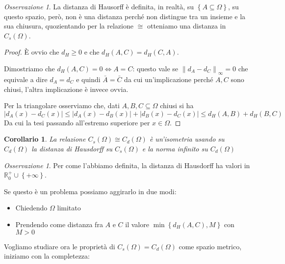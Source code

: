 \documentclass[a4paper,10pt]{article}
\newcounter{counter1}
\theoremstyle{plain}
\newtheorem{mycor}[counter1]{Corollario}
\theoremstyle{definition}
\theoremstyle{remark}
\newtheorem{myoss}[counter1]{Osservazione}
\newcommand{\set}[1]{\left\{#1\right\}}
\newcommand{\abs}[1]{\left|#1\right|}
\newcommand{\norm}[1]{\left\|#1\right\|}
\begin{document}
\begin{myoss}
  La distanza di Hausorff è definita, in realtà, su $\set{A \subseteq
    \Omega}$, su questo spazio, però, non è una distanza perché non
  distingue tra un insieme e la sua chiusura, quozientando per la
  relazione $\cong$ otteniamo una distanza in $C_s(\Omega)$.
\end{myoss}
\begin{proof}
  È ovvio che $d_H \ge 0$ e che $d_H(A,C) = d_H(C,A)$.

  Dimostriamo che $d_H(A,C) = 0 \Leftrightarrow A = C$: questo vale se
  $\norm{d_A - d_C}_\infty = 0$ che equivale a dire $d_A = d_C$ e
  quindi $\bar A = \bar C$ da cui un'implicazione perché $A,C$ sono
  chiusi, l'altra implicazione è invece ovvia.

  Per la triangolare osserviamo che, dati $A,B,C \subseteq \Omega$
  chiusi si ha
  \[ \abs{d_A(x) - d_C(x)} \le \abs{d_A(x) - d_B(x)} + \abs{d_B(x) -
    d_C(x)} \le d_H(A,B) + d_H(B,C) \]
  Da cui la tesi passando all'estremo superiore per $x\in \Omega$.
\end{proof}

\begin{mycor}
  La relazione $C_s(\Omega) \cong C_d(\Omega)$ è un'isometria usando su
  $C_d(\Omega)$ la distanza di Hausdorff su $C_s(\Omega)$ e la norma
  infinito su $C_d(\Omega)$
\end{mycor}

\begin{myoss}
  Per come l'abbiamo definita, la distanza di Hausdorff ha valori in
  $\mathbb{R}_0^+ \cup \set{+\infty}$.

  Se questo è un problema possiamo aggirarlo in due modi:
  \begin{itemize}
  \item Chiedendo $\Omega$ limitato 
  \item Prendendo come distanza fra $A$ e $C$ il valore $\min\set{ d_H
      (A,C) , M}$ con $M >0$
  \end{itemize}
\end{myoss}

Vogliamo studiare ora le propriet\`a di $C_s(\Omega) = C_d(\Omega)$ come
spazio metrico, iniziamo con la completezza:
\end{document}
